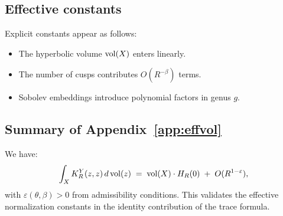 \subsection{Effective constants}
Explicit constants appear as follows:
\begin{itemize}
\item The hyperbolic volume $\operatorname{vol}(X)$ enters linearly.
\item The number of cusps contributes $O(R^{-\beta})$ terms.
\item Sobolev embeddings introduce polynomial factors in genus $g$.
\end{itemize}

\subsection{Summary of Appendix~\ref{app:effvol}}
We have:
\[
\int_X K_R^Y(z,z)\,d\operatorname{vol}(z) \;=\; \operatorname{vol}(X)\cdot H_R(0) \;+\; O(R^{1-\varepsilon}),
\]
with $\varepsilon(\theta,\beta)>0$ from admissibility conditions.
This validates the effective normalization constants in the identity
contribution of the trace formula.
